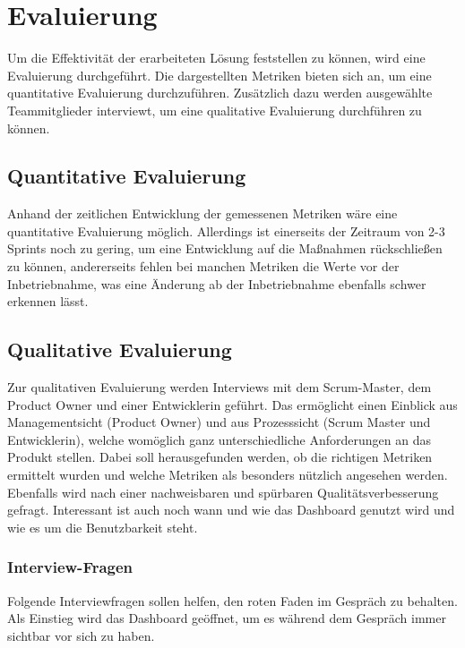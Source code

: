\chapter{Evaluierung}

Um die Effektivität der erarbeiteten Lösung feststellen zu können, wird eine Evaluierung durchgeführt.
Die dargestellten Metriken bieten sich an, um eine quantitative Evaluierung durchzuführen.
Zusätzlich dazu werden ausgewählte Teammitglieder interviewt, um eine qualitative Evaluierung durchführen zu können.

\section{Quantitative Evaluierung}

Anhand der zeitlichen Entwicklung der gemessenen Metriken wäre eine quantitative Evaluierung möglich.
Allerdings ist einerseits der Zeitraum von 2{-}3 Sprints noch zu gering, um eine Entwicklung auf die Maßnahmen rückschließen zu können,
andererseits fehlen bei manchen Metriken die Werte vor der Inbetriebnahme, was eine Änderung ab der Inbetriebnahme ebenfalls schwer erkennen lässt.

\clearpage
\section{Qualitative Evaluierung}

Zur qualitativen Evaluierung werden Interviews mit dem Scrum-Master, dem Product Owner und einer Entwicklerin geführt.
Das ermöglicht einen Einblick aus Managementsicht (Product Owner) und aus Prozesssicht (Scrum Master und Entwicklerin), welche womöglich ganz unterschiedliche Anforderungen an das Produkt stellen.
Dabei soll herausgefunden werden, ob die richtigen Metriken ermittelt wurden und welche Metriken als besonders nützlich angesehen werden.
Ebenfalls wird nach einer nachweisbaren und spürbaren Qualitätsverbesserung gefragt.
Interessant ist auch noch wann und wie das Dashboard genutzt wird und wie es um die Benutzbarkeit steht.

\subsection{Interview-Fragen}

Folgende Interviewfragen sollen helfen, den roten Faden im Gespräch zu behalten.
Als Einstieg wird das Dashboard geöffnet, um es während dem Gespräch immer sichtbar vor sich zu haben.

